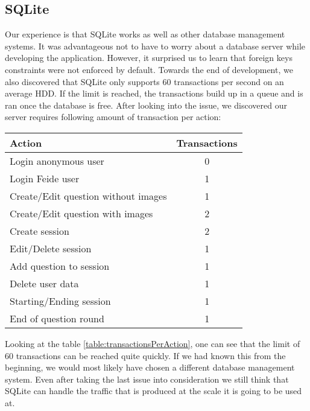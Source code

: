 \subsection{SQLite}
Our experience is that SQLite works as well as other database management systems. It was advantageous not to have to worry about a database server while developing the application. However, it surprised us to learn that foreign keys constraints were not enforced by default. Towards the end of development, we also discovered that SQLite only supports 60 transactions per second on an average HDD. If the limit is reached, the transactions build up in a queue and is ran once the database is free. After looking into the issue, we discovered our server requires following amount of transaction per action:
\begin{center}
    \begin{tabular}{|l|c|}
        \hline
        Action & Transactions \\
        \hline
        Login anonymous user & 0 \\
        \hline
        Login Feide user & 1 \\
        \hline
        Create/Edit question without images & 1 \\
        \hline
        Create/Edit question with images & 2 \\
        \hline
        Create session & 2 \\
        \hline
        Edit/Delete session & 1 \\
        \hline
        Add question to session & 1 \\
        \hline
        Delete user data & 1 \\
        \hline
        Starting/Ending session & 1 \\
        \hline
        End of question round & 1 \\
        \hline
    \end{tabular}
    \label{table:transactionsPerAction}
\end{center}
\noindent
Looking at the table \ref{table:transactionsPerAction}, one can see that the limit of 60 transactions can be reached quite quickly. If we had known this from the beginning, we would most likely have chosen a different database management system. Even after taking the last issue into consideration we still think that SQLite can handle the traffic that is produced at the scale it is going to be used at. 
